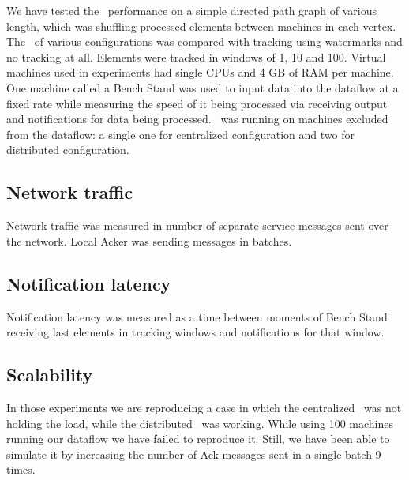 \label {fs-acker-experiments}

We have tested the \tracker\ performance on a simple directed path graph of various length, which was shuffling processed elements between machines in each vertex. The \tracker\ of various configurations was compared with  tracking using watermarks and no tracking at all. Elements were tracked in windows of 1, 10 and 100.
Virtual machines used in experiments had single CPUs and 4 GB of RAM per machine. One machine called a Bench Stand was used to input data into the dataflow at a fixed rate while measuring the speed of it being processed via receiving output and notifications for data being processed. \tracker\ was running on machines excluded from the dataflow: a single one for centralized configuration and two for distributed configuration.

\subsection{Network traffic}

Network traffic was measured in number of separate service messages sent over the network. Local Acker was sending messages in batches.


\subsection{Notification latency}

Notification latency was measured as a time between moments of Bench Stand receiving last elements in tracking windows and notifications for that window.


\subsection{Scalability}

In those experiments we are reproducing a case in which the centralized \tracker\ was not holding the load, while the distributed \tracker\ was working. While using 100 machines running our dataflow we have failed to reproduce it. Still, we have been able to simulate it by increasing the number of Ack messages sent in a single batch 9 times.


